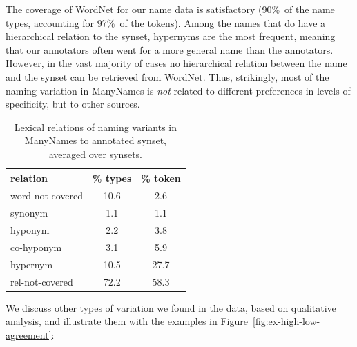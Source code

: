 The coverage of WordNet for our name data is satisfactory (90\%\ of the name types, accounting for 97\%\ of the tokens).
Among the names that do have a hierarchical relation to the synset, hypernyms are the most frequent, meaning that our annotators often went for a more general name than the \vg annotators.
However, in the vast majority of cases no hierarchical relation between the name and the synset can be retrieved from WordNet.
Thus, strikingly, most of the naming variation in ManyNames is \textit{not} related to different preferences in levels of specificity, %
 but to other sources.

\begin{table}
\small
\centering
\begin{tabular}{lcc}
\toprule
         relation & \% types & \% token \\
\midrule
 word-not-covered &  10.6 &  2.6 \\
\midrule
 synonym &  1.1 &  1.1 \\
 hyponym &  2.2 &  3.8 \\
 co-hyponym &  3.1 &  5.9 \\
 hypernym &  10.5 &  27.7 \\
 rel-not-covered &  72.2 &  58.3 \\
\bottomrule
\end{tabular}
\caption{Lexical relations of naming variants in ManyNames to annotated \vg synset, averaged over synsets.}
\label{tab:rel}
\end{table}

We discuss other types of variation we found in the data, based on qualitative analysis, and illustrate them with the examples in Figure\ \ref{fig:ex-high-low-agreement}:

